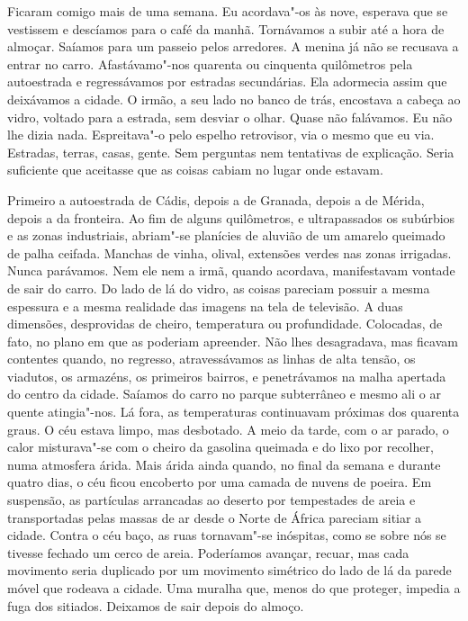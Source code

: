 Ficaram comigo mais de uma semana. Eu acordava"-os às nove, esperava que
se vestissem e descíamos para o café da manhã. Tornávamos a subir até
a hora de almoçar. Saíamos para um passeio pelos arredores. A menina já
não se recusava a entrar no carro. Afastávamo"-nos quarenta ou cinquenta
quilômetros pela autoestrada e regressávamos por estradas secundárias.
Ela adormecia assim que deixávamos a cidade. O irmão, a seu lado no
banco de trás, encostava a cabeça ao vidro, voltado para a estrada, sem
desviar o olhar. Quase não falávamos. Eu não lhe dizia nada.
Espreitava"-o pelo espelho retrovisor, via o mesmo que eu via. Estradas,
terras, casas, gente. Sem perguntas nem tentativas de explicação. Seria
suficiente que aceitasse que as coisas cabiam no lugar onde estavam.

Primeiro a autoestrada de Cádis, depois a de Granada, depois a de
Mérida, depois a da fronteira. Ao fim de alguns quilômetros, e
ultrapassados os subúrbios e as zonas industriais, abriam"-se planícies
de aluvião de um amarelo queimado de palha ceifada. Manchas de vinha,
olival, extensões verdes nas zonas irrigadas. Nunca parávamos. Nem ele
nem a irmã, quando acordava, manifestavam vontade de sair do carro. Do
lado de lá do vidro, as coisas pareciam possuir a mesma espessura e a
mesma realidade das imagens na tela de televisão. A duas dimensões,
desprovidas de cheiro, temperatura ou profundidade. Colocadas, de fato,
no plano em que as poderiam apreender. Não lhes desagradava, mas ficavam
contentes quando, no regresso, atravessávamos as linhas de alta tensão,
os viadutos, os armazéns, os primeiros bairros, e penetrávamos na malha
apertada do centro da cidade. Saíamos do carro no parque subterrâneo e
mesmo ali o ar quente atingia"-nos. Lá fora, as temperaturas continuavam
próximas dos quarenta graus. O céu estava limpo, mas desbotado. A meio
da tarde, com o ar parado, o calor misturava"-se com o cheiro da
gasolina queimada e do lixo por recolher, numa atmosfera árida. Mais
árida ainda quando, no final da semana e durante quatro dias, o céu
ficou encoberto por uma camada de nuvens de poeira. Em suspensão, as
partículas arrancadas ao deserto por tempestades de areia e
transportadas pelas massas de ar desde o Norte de África pareciam sitiar
a cidade. Contra o céu baço, as ruas tornavam"-se inóspitas, como se
sobre nós se tivesse fechado um cerco de areia. Poderíamos avançar,
recuar, mas cada movimento seria duplicado por um movimento simétrico do
lado de lá da parede móvel que rodeava a cidade. Uma muralha que, menos
do que proteger, impedia a fuga dos sitiados. Deixamos de sair depois do
almoço.

